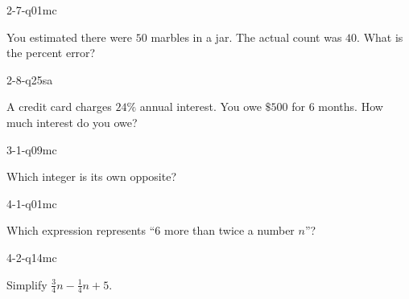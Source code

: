 \begin{practiceQuestion}{2-7-q01}{mc}
\begin{questionText}
You estimated there were $50$ marbles in a jar. The actual count was $40$. What is the percent error?
\end{questionText}
\end{practiceQuestion}

\begin{practiceQuestion}{2-8-q25}{sa}
\begin{questionText}
A credit card charges $24\%$ annual interest. You owe $\$500$ for $6$ months. How much interest do you owe?
\end{questionText}
\end{practiceQuestion}

\begin{practiceQuestion}{3-1-q09}{mc}
\begin{questionText}
Which integer is its own opposite?
\end{questionText}
\end{practiceQuestion}

\begin{practiceQuestion}{4-1-q01}{mc}
\begin{questionText}
Which expression represents ``$6$ more than twice a number $n$''?
\end{questionText}
\end{practiceQuestion}

\begin{practiceQuestion}{4-2-q14}{mc}
\begin{questionText}
Simplify $\frac{3}{4}n - \frac{1}{4}n + 5$.


\begin{center}
\hspace{1cm}
\end{center}
\end{questionText}
\end{practiceQuestion}

